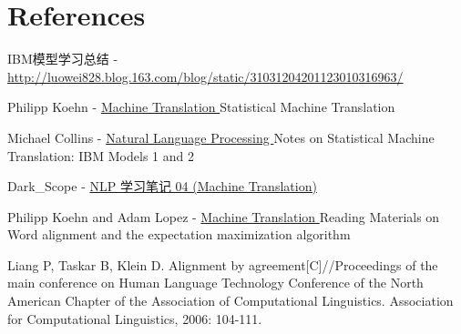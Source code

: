 \documentclass[11pt]{article}
\begin{document}
\section{References}
\begin{enumerate}[{[}1{]}]
\item IBM模型学习总结 - \href{http://luowei828.blog.163.com/blog/static/31031204201123010316963/}{ http://luowei828.blog.163.com/blog/static/31031204201123010316963/ }\label{note1}
\item Philipp Koehn - \href{http://www.inf.ed.ac.uk/teaching/courses/mt/} { Machine Translation }\label{note3} Statistical Machine Translation
\item Michael Collins - \href{http://www.cs.columbia.edu/~cs4705/}{ Natural Language Processing }\label{note2} Notes on Statistical Machine Translation: IBM Models 1 and 2
\item Dark\_Scope - \href{http://blog.csdn.net/dark_scope/article/details/8774000}{NLP 学习笔记 04 (Machine Translation)}\label{note4}
\item Philipp Koehn and Adam Lopez - \href{http://www.inf.ed.ac.uk/teaching/courses/mt/syllabus.html} { Machine Translation }\label{note6}  Reading Materials on Word alignment and the expectation maximization algorithm
\item Liang P, Taskar B, Klein D. Alignment by agreement[C]//Proceedings of the main conference on Human Language Technology Conference of the North American Chapter of the Association of Computational Linguistics. Association for Computational Linguistics, 2006: 104-111.\label{note5}
\end{enumerate}
\end{document}
